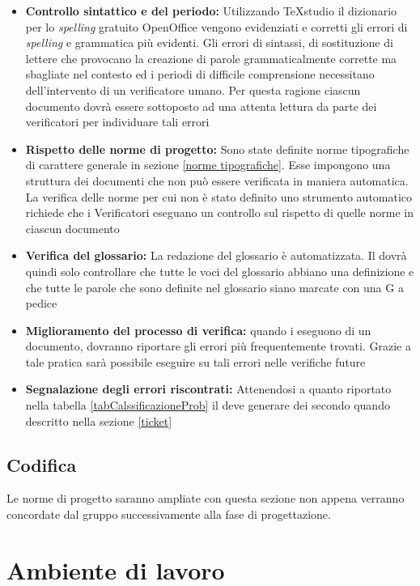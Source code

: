 \documentclass[12pt,a4paper]{article}
\begin{document}
\begin{itemize}
	\item \textbf{Controllo sintattico e del periodo:} Utilizzando TeXstudio il dizionario per lo \textit{spelling} gratuito OpenOffice vengono evidenziati e corretti gli errori di \textit{spelling} e grammatica più evidenti. Gli errori di sintassi, di sostituzione di lettere che provocano la creazione di parole grammaticalmente corrette ma sbagliate nel contesto ed i periodi di difficile comprensione necessitano dell'intervento di un verificatore umano. Per questa ragione ciascun documento dovrà essere sottoposto ad una attenta lettura da parte dei verificatori per individuare tali errori
	\item \textbf{Rispetto delle norme di progetto:} Sono state definite norme tipografiche di carattere generale in \NdP{} sezione \ref{norme tipografiche}. Esse impongono una struttura dei documenti che non può essere verificata in maniera automatica. La verifica delle norme per cui non è stato definito uno strumento automatico richiede che i Verificatori eseguano un controllo sul rispetto di quelle norme in ciascun documento
	\item \textbf{Verifica del glossario:} La redazione del glossario è automatizzata. Il \VR{} dovrà quindi solo controllare che tutte le voci del glossario abbiano una definizione e che tutte le parole che sono definite nel glossario siano marcate con una G a pedice	
	\item \textbf{Miglioramento del processo di verifica:} quando i \VRpl{} eseguono \emph{} di un documento, dovranno riportare gli errori più frequentemente trovati. Grazie a tale pratica sarà possibile eseguire \emph{} su tali errori nelle verifiche future
	\item \textbf{Segnalazione degli errori riscontrati:} Attenendosi a quanto riportato nella tabella \ref{tabCalssificazioneProb} il \VR{} deve generare dei \textit{} secondo quando descritto nella sezione \ref{ticket}
\end{itemize}


\subsection{Codifica}
Le norme di progetto saranno ampliate con questa sezione non appena verranno concordate dal gruppo successivamente alla fase di progettazione.


\newpage
\section{Ambiente di lavoro}
\end{document}
